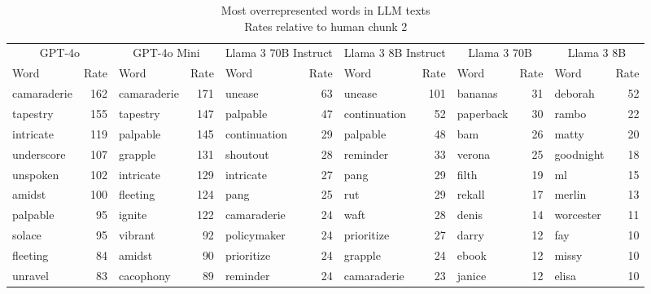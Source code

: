 \begin{table}[!t]
\caption*{
{\large Most overrepresented words in LLM texts} \\ 
{\small Rates relative to human chunk 2}
} 
\fontsize{12.0pt}{14.4pt}\selectfont
\begin{tabular*}{\linewidth}{@{\extracolsep{\fill}}lrlrlrlrlrlr}
\toprule
\multicolumn{2}{c}{GPT-4o} & \multicolumn{2}{c}{GPT-4o Mini} & \multicolumn{2}{c}{Llama 3 70B Instruct} & \multicolumn{2}{c}{Llama 3 8B Instruct} & \multicolumn{2}{c}{Llama 3 70B} & \multicolumn{2}{c}{Llama 3 8B} \\ 
\cmidrule(lr){1-2} \cmidrule(lr){3-4} \cmidrule(lr){5-6} \cmidrule(lr){7-8} \cmidrule(lr){9-10} \cmidrule(lr){11-12}
Word & Rate & Word & Rate & Word & Rate & Word & Rate & Word & Rate & Word & Rate \\ 
\midrule\addlinespace[2.5pt]
camaraderie & 162 & camaraderie & 171 & unease & 63 & unease & 101 & bananas & 31 & deborah & 52 \\ 
tapestry & 155 & tapestry & 147 & palpable & 47 & continuation & 52 & paperback & 30 & rambo & 22 \\ 
intricate & 119 & palpable & 145 & continuation & 29 & palpable & 48 & bam & 26 & matty & 20 \\ 
underscore & 107 & grapple & 131 & shoutout & 28 & reminder & 33 & verona & 25 & goodnight & 18 \\ 
unspoken & 102 & intricate & 129 & intricate & 27 & pang & 29 & filth & 19 & ml & 15 \\ 
amidst & 100 & fleeting & 124 & pang & 25 & rut & 29 & rekall & 17 & merlin & 13 \\ 
palpable & 95 & ignite & 122 & camaraderie & 24 & waft & 28 & denis & 14 & worcester & 11 \\ 
solace & 95 & vibrant & 92 & policymaker & 24 & prioritize & 27 & darry & 12 & fay & 10 \\ 
fleeting & 84 & amidst & 90 & prioritize & 24 & grapple & 24 & ebook & 12 & missy & 10 \\ 
unravel & 83 & cacophony & 89 & reminder & 24 & camaraderie & 23 & janice & 12 & elisa & 10 \\ 
\bottomrule
\end{tabular*}
\end{table}

